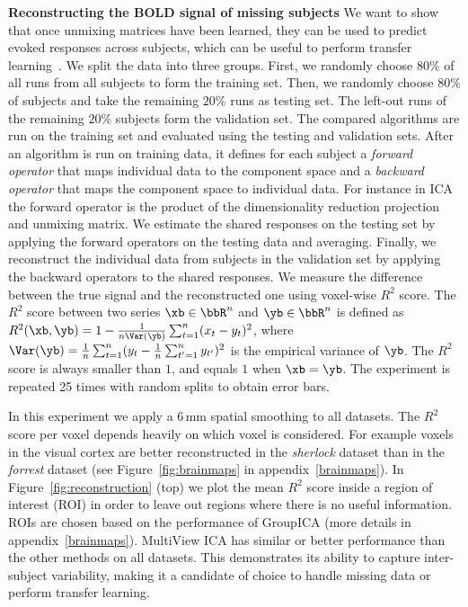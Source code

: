 \textbf{Reconstructing the BOLD signal of missing subjects}
We want to show that once unmixing matrices have been learned, they can be
used to predict
evoked responses across subjects, which can be useful to perform transfer learning~\cite{zhang2018transfer}.
%
We split the data into three groups. First, we randomly choose $80\%$ of all runs from all subjects to form the training set.
%
Then, we randomly choose $80\%$ of subjects and take the remaining $20\%$  runs as testing set.
%
The left-out runs  of the remaining $20\%$ subjects form the validation set.
%
The compared algorithms are run on the training set and evaluated using the testing and validation sets.
%
After an algorithm is run on training data, it defines for each subject a \emph{forward operator} that maps individual data to the component space and a \emph{backward operator} that maps the component space to individual data. For instance in ICA the forward operator is the product of the dimensionality reduction projection and unmixing matrix.
%
We estimate the shared responses on the testing set by applying the forward operators on the testing data and averaging. Finally, we reconstruct the individual data from subjects in the validation set by applying the backward operators to the shared responses. We measure the difference between the true signal and the reconstructed one using voxel-wise $R^2$ score. The $R^2$ score between two series $\xb \in \bbR^n$ and $\yb \in \bbR^n$ is defined as
$R^2(\xb, \yb) = 1 - \frac1{n\Var(\yb)}\sum_{t=1}^n (x_t - y_t)^2$, where $\Var(\yb) = \frac1n\sum_{t=1}^n (y_t - \frac1n \sum_{t'=1}^n y_{t'})^2$ is the empirical variance of $\yb$.
%
The $R^2$ score is always smaller than $1$, and equals $1$ when $\xb= \yb$.
The experiment is repeated 25 times with random splits to obtain error bars.


In this experiment we apply a 6\,mm spatial smoothing to all datasets. The $R^2$ score per
voxel depends heavily on which voxel is considered. For example voxels in the
visual cortex are better reconstructed in the \emph{sherlock} dataset than in
the \emph{forrest} dataset (see Figure~\ref{fig:brainmaps} in appendix~\ref{brainmaps}). In Figure~\ref{fig:reconstruction}
(top) we plot the mean $R^2$ score inside a region of interest (ROI) in order to leave out regions where there is no useful information.
%
ROIs are chosen based on the performance of GroupICA (more
details in appendix~\ref{brainmaps}).
%
MultiView ICA has similar or better performance than the other methods on all datasets.
%
This demonstrates its ability to capture inter-subject variability, making it a candidate of choice to handle missing data or perform transfer learning.

